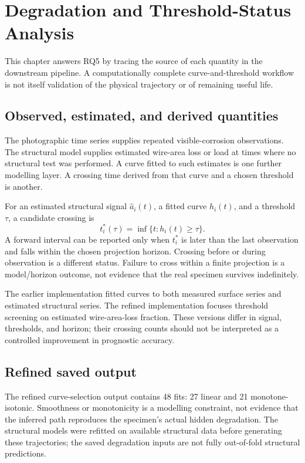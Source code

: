 \chapter{Degradation and Threshold-Status Analysis}\label{ch:proxy}
This chapter answers RQ5 by tracing the source of each quantity in the downstream pipeline. A computationally complete curve-and-threshold workflow is not itself validation of the physical trajectory or of remaining useful life.

\section{Observed, estimated, and derived quantities}
The photographic time series supplies repeated visible-corrosion observations. The structural model supplies estimated wire-area loss or load at times where no structural test was performed. A curve fitted to such estimates is one further modelling layer. A crossing time derived from that curve and a chosen threshold is another.

For an estimated structural signal $\widehat a_i(t)$, a fitted curve $h_i(t)$, and a threshold $\tau$, a candidate crossing is
\begin{equation}
t_i^{\ast}(\tau)=\inf\{t:h_i(t)\geq\tau\}.
\end{equation}
A forward interval can be reported only when $t_i^{\ast}$ is later than the last observation and falls within the chosen projection horizon. Crossing before or during observation is a different status. Failure to cross within a finite projection is a model/horizon outcome, not evidence that the real specimen survives indefinitely.

The earlier implementation fitted curves to both measured surface series and estimated structural series. The refined implementation focuses threshold screening on estimated wire-area-loss fraction. These versions differ in signal, thresholds, and horizon; their crossing counts should not be interpreted as a controlled improvement in prognostic accuracy.

\section{Refined saved output}
The refined curve-selection output contains 48 fits: 27 linear and 21 monotone-isotonic. Smoothness or monotonicity is a modelling constraint, not evidence that the inferred path reproduces the specimen's actual hidden degradation. The structural models were refitted on available structural data before generating these trajectories; the saved degradation inputs are not fully out-of-fold structural predictions.

